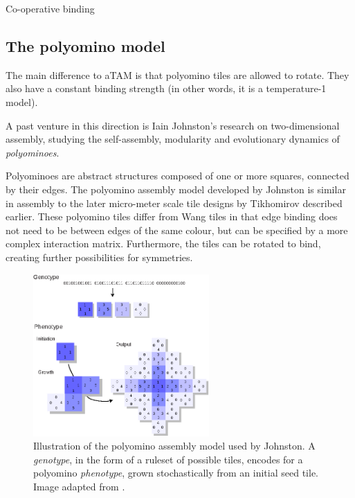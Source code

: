Co-operative binding

\subsection{The polyomino model}

The main difference to aTAM is that polyomino tiles are allowed to rotate. They also have a constant binding strength (in other words, it is a temperature-1 model).

A past venture in this direction is Iain Johnston's research on two-dimensional assembly\cite{ahnert2010self}\cite{johnston2011evolutionary}, studying the self-assembly, modularity and evolutionary dynamics of \emph{polyominoes}.

Polyominoes are abstract structures composed of one or more squares, connected by their edges. The polyomino assembly model developed by Johnston is similar in assembly to the later micro-meter scale tile designs by Tikhomirov \cite{tikhomirov2017fractal} described earlier. These polyomino tiles differ from Wang tiles\cite{wang1961proving} in that edge binding does not need to be between edges of the same colour, but can be specified by a more complex interaction matrix. Furthermore, the tiles can be rotated to bind, creating further possibilities for symmetries.

\begin{figure}[h]
    \centering\includegraphics[width=0.6\textwidth]{figures/polyominoes.eps}
    \caption{Illustration of the polyomino assembly model used by Johnston. A \emph{genotype}, in the form of a ruleset of possible tiles, encodes for a polyomino \emph{phenotype}, grown stochastically from an initial seed tile. Image adapted from \cite{johnston2011evolutionary}.}
    \label{fig:polyominoes}
\end{figure}

